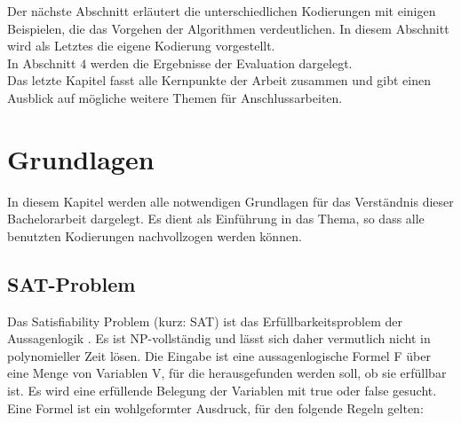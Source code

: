 \documentclass[a4,abstract=on]{scrartcl}
\newcommand*\stdsection{}
\let\stdsection\section
\renewcommand*\section{%
    \clearpage\ifodd\value{page}\else\mbox{}\clearpage\fi
    \stdsection}
\begin{document}
Der nächste Abschnitt erläutert die unterschiedlichen Kodierungen mit einigen Beispielen, die das Vorgehen der Algorithmen verdeutlichen. In diesem Abschnitt wird als Letztes die eigene Kodierung vorgestellt.\\
In Abschnitt $4$ werden die Ergebnisse der Evaluation dargelegt. \\
Das letzte Kapitel fasst alle Kernpunkte der Arbeit zusammen und gibt einen Ausblick auf mögliche weitere Themen für Anschlussarbeiten.


\section{Grundlagen}
In diesem Kapitel werden alle notwendigen Grundlagen für das Verständnis dieser Bachelorarbeit dargelegt. Es dient als Einführung in das Thema, so dass alle benutzten Kodierungen nachvollzogen werden können.
\subsection{SAT-Problem}
Das Satisfiability Problem (kurz: SAT) ist das Erfüllbarkeitsproblem der Aussagenlogik \cite[vgl.][]{sat-problem}. Es ist NP-vollständig und lässt sich daher vermutlich nicht in polynomieller Zeit lösen. Die Eingabe ist eine aussagenlogische Formel F über eine Menge von Variablen V, für die herausgefunden werden soll, ob sie erfüllbar ist. Es wird eine erfüllende Belegung der Variablen mit true oder false gesucht.\\
Eine Formel ist ein wohlgeformter Ausdruck, für den folgende Regeln gelten:
\end{document}
